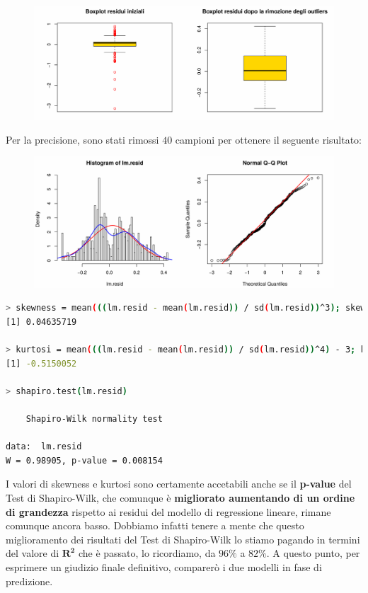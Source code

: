 \documentclass[11pt,a4paper]{article}
\begin{document}
\begin{figure}[H]
	\vspace{-1.3cm}
	\begin{center}
		\hspace*{-1.5cm}
		\includegraphics[scale=0.7]{imgs/residuals_boxplots_log.pdf}
	\end{center}
\end{figure}
\vspace{-1cm}\noindent
Per la precisione, sono stati rimossi $40$ campioni per ottenere il seguente
risultato:
\begin{figure}[H]
	\begin{center}
		\hspace*{-1.5cm}
		\includegraphics[scale=0.7]{imgs/residuals_2_log.pdf}
	\end{center}
\end{figure}
\vspace{-0.9cm}
\begin{lstlisting}[language=bash,basicstyle=\tiny,tabsize=2,frame = single]
> skewness = mean(((lm.resid - mean(lm.resid)) / sd(lm.resid))^3); skewness
[1] 0.04635719

> kurtosi = mean(((lm.resid - mean(lm.resid)) / sd(lm.resid))^4) - 3; kurtosi
[1] -0.5150052

> shapiro.test(lm.resid)

	Shapiro-Wilk normality test

data:  lm.resid
W = 0.98905, p-value = 0.008154
\end{lstlisting}
I valori di skewness e kurtosi sono certamente accetabili anche se il
\textbf{p-value} del Test di Shapiro-Wilk, che comunque \`e \textbf{migliorato
aumentando di un ordine di grandezza} rispetto ai residui del modello di
regressione lineare, rimane comunque ancora basso. Dobbiamo infatti tenere a
mente che questo miglioramento dei risultati del Test di Shapiro-Wilk lo stiamo
pagando in termini del valore di $\boldsymbol{R^2}$ che \`e passato, lo
ricordiamo, da $96\%$ a $82\%$. A questo punto, per esprimere un giudizio finale
definitivo, comparer\`o i due modelli in fase di predizione.
\end{document}
